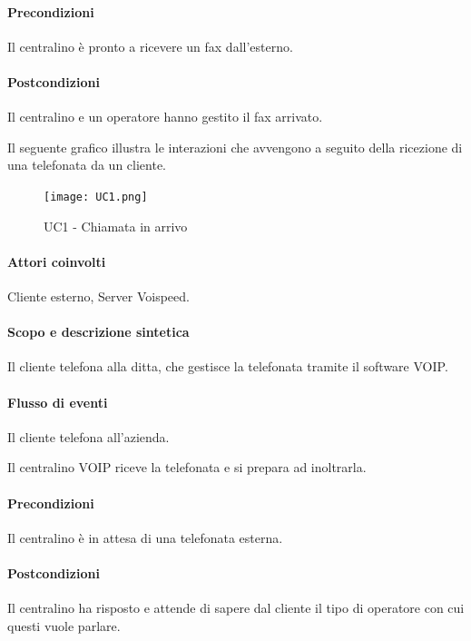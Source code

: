 \paragraph{Precondizioni} Il centralino \`e pronto a ricevere un fax dall'esterno.
\paragraph{Postcondizioni} Il centralino e un operatore hanno gestito il fax arrivato.

\newpage
{}
\label{uc_chiamata_in_arrivo}
Il seguente grafico illustra le interazioni che avvengono a seguito della ricezione di una telefonata da un cliente.

\begin{figure}[!ht]
\centering
\texttt{[image: UC1.png]}
\caption{UC1 - Chiamata in arrivo}
\end{figure}

\paragraph{Attori coinvolti} Cliente esterno, Server Voispeed.
\paragraph{Scopo e descrizione sintetica}
Il cliente telefona alla ditta, che gestisce la telefonata tramite il software VOIP.
\paragraph{Flusso di eventi}
\begin{elenconumerato}[\textbf{}]{\subsubsecindent}
\item Il cliente telefona all'azienda.
\item Il centralino VOIP riceve la telefonata e si prepara ad inoltrarla.
\end{elenconumerato}
\paragraph{Precondizioni}  Il centralino \` e in attesa di una telefonata esterna.
\paragraph{Postcondizioni} Il centralino ha risposto e attende di sapere dal cliente il tipo di operatore con cui questi vuole parlare.

